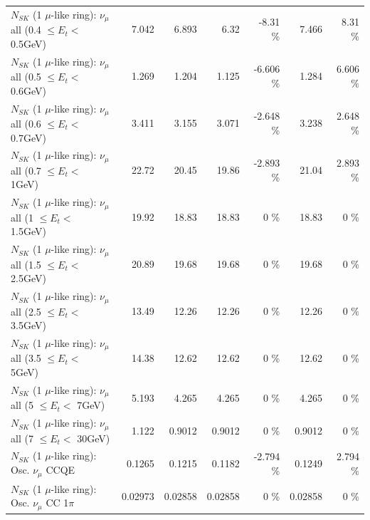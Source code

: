 \begin{table}
\begin{tabular}{| l | r | r | r  r | r  r |}
       $N_{SK}$ (1 $\mu$-like ring): $\nu_{\mu}$ all (0.4 $\leq E_{t} <$ 0.5GeV) &           7.042 &           6.893 &            6.32 &    -8.31 \%  &           7.466 &     8.31 \%  \\ 
       $N_{SK}$ (1 $\mu$-like ring): $\nu_{\mu}$ all (0.5 $\leq E_{t} <$ 0.6GeV) &           1.269 &           1.204 &           1.125 &   -6.606 \%  &           1.284 &    6.606 \%  \\ 
       $N_{SK}$ (1 $\mu$-like ring): $\nu_{\mu}$ all (0.6 $\leq E_{t} <$ 0.7GeV) &           3.411 &           3.155 &           3.071 &   -2.648 \%  &           3.238 &    2.648 \%  \\ 
         $N_{SK}$ (1 $\mu$-like ring): $\nu_{\mu}$ all (0.7 $\leq E_{t} <$ 1GeV) &           22.72 &           20.45 &           19.86 &   -2.893 \%  &           21.04 &    2.893 \%  \\ 
         $N_{SK}$ (1 $\mu$-like ring): $\nu_{\mu}$ all (1 $\leq E_{t} <$ 1.5GeV) &           19.92 &           18.83 &           18.83 &        0 \%  &           18.83 &        0 \%  \\ 
       $N_{SK}$ (1 $\mu$-like ring): $\nu_{\mu}$ all (1.5 $\leq E_{t} <$ 2.5GeV) &           20.89 &           19.68 &           19.68 &        0 \%  &           19.68 &        0 \%  \\ 
       $N_{SK}$ (1 $\mu$-like ring): $\nu_{\mu}$ all (2.5 $\leq E_{t} <$ 3.5GeV) &           13.49 &           12.26 &           12.26 &        0 \%  &           12.26 &        0 \%  \\ 
         $N_{SK}$ (1 $\mu$-like ring): $\nu_{\mu}$ all (3.5 $\leq E_{t} <$ 5GeV) &           14.38 &           12.62 &           12.62 &        0 \%  &           12.62 &        0 \%  \\ 
           $N_{SK}$ (1 $\mu$-like ring): $\nu_{\mu}$ all (5 $\leq E_{t} <$ 7GeV) &           5.193 &           4.265 &           4.265 &        0 \%  &           4.265 &        0 \%  \\ 
          $N_{SK}$ (1 $\mu$-like ring): $\nu_{\mu}$ all (7 $\leq E_{t} <$ 30GeV) &           1.122 &          0.9012 &          0.9012 &        0 \%  &          0.9012 &        0 \%  \\ 
\hline
\hline
                               $N_{SK}$ (1 $\mu$-like ring): Osc. $\nu_\mu$ CCQE &          0.1265 &          0.1215 &          0.1182 &   -2.794 \%  &          0.1249 &    2.794 \%  \\ 
                          $N_{SK}$ (1 $\mu$-like ring): Osc. $\nu_\mu$ CC 1$\pi$ &         0.02973 &         0.02858 &         0.02858 &        0 \%  &         0.02858 &        0 \%  \\ 

\end{tabular}
\end{table}

